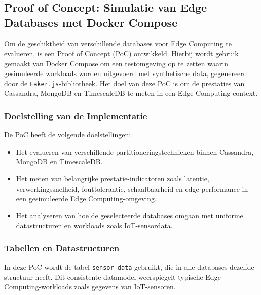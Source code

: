 \chapter{}%
\label{ch:proof-of-concept}

\section{Proof of Concept: Simulatie van Edge Databases met Docker Compose}

Om de geschiktheid van verschillende databases voor Edge Computing te evalueren, is een Proof of Concept (PoC) ontwikkeld. Hierbij wordt gebruik gemaakt van Docker Compose om een testomgeving op te zetten waarin gesimuleerde workloads worden uitgevoerd met synthetische data, gegenereerd door de \texttt{Faker.js}-bibliotheek. Het doel van deze PoC is om de prestaties van Cassandra, MongoDB en TimescaleDB te meten in een Edge Computing-context.

\subsection{Doelstelling van de Implementatie}
De PoC heeft de volgende doelstellingen:
\begin{itemize}
    \item Het evalueren van verschillende partitioneringstechnieken binnen Cassandra, MongoDB en TimescaleDB.
    \item Het meten van belangrijke prestatie-indicatoren zoals latentie, verwerkingssnelheid, fouttolerantie, schaalbaarheid en edge performance in een gesimuleerde Edge Computing-omgeving.
    \item Het analyseren van hoe de geselecteerde databases omgaan met uniforme datastructuren en workloads zoals IoT-sensordata.
\end{itemize}

\subsection{Tabellen en Datastructuren}
In deze PoC wordt de tabel \texttt{sensor\_data} gebruikt, die in alle databases dezelfde structuur heeft. Dit consistente datamodel weerspiegelt typische Edge Computing-workloads zoals gegevens van IoT-sensoren.

